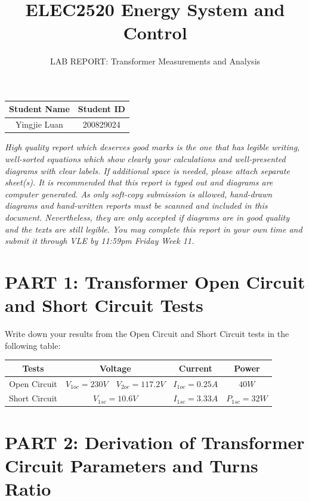 \documentclass[11pt]{scrartcl}
\begin{document}
\title{ELEC2520      Energy System and Control}
\subtitle{LAB REPORT:  Transformer Measurements and Analysis}
\maketitle

\begin{center}
\begin{tabular}{|c|c|}
\hline
Student Name & Student ID \\
\hline
Yingjie Luan & 200829024 \\
\hline
\end{tabular}
\end{center}

\textit{High quality report which deserves good marks is the one that has legible writing, well-sorted equations which show clearly your calculations and well-presented diagrams with clear labels. If additional space is needed, please attach separate sheet(s). It is recommended that this report is typed out and diagrams are computer generated. As only soft-copy submission is allowed, hand-drawn diagrams and hand-written reports must be scanned and included in this document. Nevertheless, they are only accepted if diagrams are in good quality and the texts are still legible. You may complete this report in your own time and submit it through VLE by 11:59pm Friday Week 11. }

\section*{PART 1:  Transformer Open Circuit and Short Circuit Tests}

Write down your results from the Open Circuit and Short Circuit tests in the following table:\\

\begin{tabular}{|c|c|c|c|c|}
\hline
Tests&\multicolumn{2}{c}{Voltage}& Current&Power\\
\hline
Open Circuit& $V_{1oc}=230V$ & $V_{2oc}=117.2V$ & $I_{1oc}=0.25A$&$40W$\\
\hline
Short Circuit&\multicolumn{2}{c}{$V_{1sc}=10.6V$}&$I_{1sc}=3.33A$&$P_{1sc}=32W$\\
\hline
\end{tabular}


\section*{PART 2:  Derivation of Transformer Circuit Parameters and Turns Ratio}
\end{document}
